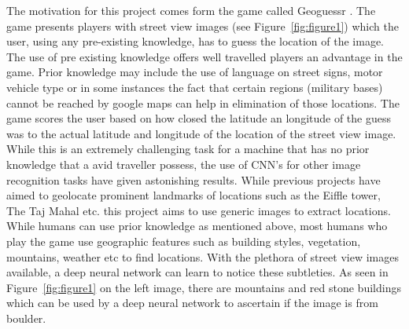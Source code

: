 \documentclass{sigchi}
\begin{document}
The motivation for this project comes form the game called Geoguessr \cite{Geoguessr:Online}. The game presents players with street view images (see Figure~\ref{fig:figure1}) which the user, using any pre-existing knowledge, has to guess the location of the image. The use of pre existing knowledge offers well travelled players an advantage in the game. Prior knowledge may include the use of language on street signs, motor vehicle type or in some instances the fact that certain regions (military bases) cannot be reached by google maps can help in elimination of those locations. The game scores the user based on how closed the latitude an longitude of the guess was to the actual latitude and longitude of the location of the street view image. While this is an extremely challenging task for a machine that has no prior knowledge that a avid traveller possess, the use of CNN's for other image recognition tasks have given astonishing results. While previous projects have aimed to geolocate prominent landmarks of locations such as the Eiffle tower, The Taj Mahal etc. this project  aims to use generic images to extract locations. While humans can use prior knowledge as mentioned above, most humans who play the game use geographic features such as building styles, vegetation, mountains, weather etc to find locations. With the plethora of street view images available, a deep neural network can learn to notice these subtleties. As seen in Figure~\ref{fig:figure1} on the left image, there are mountains and red stone buildings which can be used by a deep neural network to ascertain if the image is from boulder. 
\end{document}

